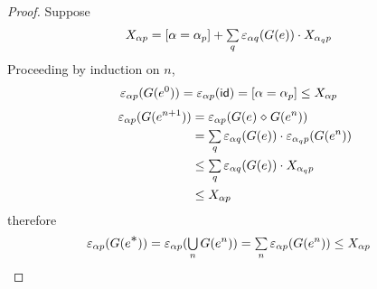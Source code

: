 \documentclass{article}
\renewcommand\smash{\mathrel{\diamond}}
\newcommand\ssum{\mathop{\textstyle\sum}}
\newcommand\bval[1]{[#1]}
\renewcommand\star{^{\textstyle *}}
\newcommand\id{\mathsf{id}}
\newcommand\sbigcup{\mathop{\textstyle\bigcup}}
\begin{document}
\begin{proof}
Suppose
\begin{align*}
X_{\alpha p}
&= \bval{\alpha=\alpha_p} + \ssum_{q} \eps_{\alpha q}(G(e))\cdot X_{\alpha_q p}
\end{align*}
Proceeding by induction on $n$,
\begin{align*}
\eps_{\alpha p}(G(e^0))
&= \eps_{\alpha p}(\id)
= \bval{\alpha=\alpha_p}
\leq X_{\alpha p}
\end{align*}
\begin{align*}
\eps_{\alpha p}(G(e^{n+1}))
&= \eps_{\alpha p}(G(e)\smash G(e^n))\\
&= \ssum_q \eps_{\alpha q}(G(e))\cdot\eps_{\alpha_q p}(G(e^n))\\
&\leq \ssum_q \eps_{\alpha q}(G(e))\cdot X_{\alpha_q p}\\
&\leq X_{\alpha p}
\end{align*}
therefore
\begin{align*}
\eps_{\alpha p}(G(e\star))
&= \eps_{\alpha p}(\sbigcup_n G(e^n))
= \ssum_n\eps_{\alpha p}(G(e^n))
\leq X_{\alpha p}
\end{align*}
\end{proof}
\end{document}
